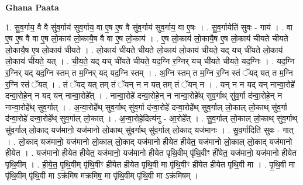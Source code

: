 \documentclass[17pt]{extarticle}
\begin{document}
\textbf{Ghana Paata } \newline

1. सु॒व॒र्गाय॒ वै वै सु॑व॒र्गाय॑ सुव॒र्गाय॒ वा ए॒ष ए॒ष वै सु॑व॒र्गाय॑ सुव॒र्गाय॒ वा ए॒षः । . सु॒व॒र्गायेति॑ सुवः - गाय॑ । . वा ए॒ष ए॒ष वै वा ए॒ष लो॒काय॑ लो॒कायै॒ष वै वा ए॒ष लो॒काय॑ । . ए॒ष लो॒काय॑ लो॒कायै॒ष ए॒ष लो॒काय॑ चीयते चीयते लो॒कायै॒ष ए॒ष लो॒काय॑ चीयते । . लो॒काय॑ चीयते चीयते लो॒काय॑ लो॒काय॑ चीयते॒ यद् यच् ची॑यते लो॒काय॑ लो॒काय॑ चीयते॒ यत् । . ची॒य॒ते॒ यद् यच् ची॑यते चीयते॒ यद॒ग्नि र॒ग्निर् यच् ची॑यते चीयते॒ यद॒ग्निः । . यद॒ग्नि र॒ग्निर् यद् यद॒ग्नि स्तम् त म॒ग्निर् यद् यद॒ग्नि स्तम् । . अ॒ग्नि स्तम् त म॒ग्नि र॒ग्नि स्तं ॅयद् यत् त म॒ग्नि र॒ग्नि स्तं ॅयत् । . तं ॅयद् यत् तम् तं ॅयन् न न यत् तम् तं ॅयन् न । . यन् न न यद् यन् नान्वा॒रोहे॑ दन्वा॒रोहे॒न् न यद् यन् नान्वा॒रोहे᳚त् । . नान्वा॒रोहे॑ दन्वा॒रोहे॒न् न नान्वा॒रोहे᳚थ् सुव॒र्गाथ् सु॑व॒र्गा द॑न्वा॒रोहे॒न् न नान्वा॒रोहे᳚थ् सुव॒र्गात् । . अ॒न्वा॒रोहे᳚थ् सुव॒र्गाथ् सु॑व॒र्गा द॑न्वा॒रोहे॑ दन्वा॒रोहे᳚थ् सुव॒र्गाल् लो॒काल् लो॒काथ् सु॑व॒र्गा द॑न्वा॒रोहे॑ दन्वा॒रोहे᳚थ् सुव॒र्गाल् लो॒कात् । . अ॒न्वा॒रोहे॒दित्य॑नु - आ॒रोहे᳚त् । . सु॒व॒र्गाल् लो॒काल् लो॒काथ् सु॑व॒र्गाथ् सु॑व॒र्गाल् लो॒काद् यज॑मानो॒ यज॑मानो लो॒काथ् सु॑व॒र्गाथ् सु॑व॒र्गाल् लो॒काद् यज॑मानः । . सु॒व॒र्गादिति॑ सुवः - गात् । . लो॒काद् यज॑मानो॒ यज॑मानो लो॒काल् लो॒काद् यज॑मानो हीयेत हीयेत॒ यज॑मानो लो॒काल् लो॒काद् यज॑मानो हीयेत । . यज॑मानो हीयेत हीयेत॒ यज॑मानो॒ यज॑मानो हीयेत पृथि॒वीम् पृ॑थि॒वीꣳ ही॑येत॒ यज॑मानो॒ यज॑मानो हीयेत पृथि॒वीम् । . ही॒ये॒त॒ पृ॒थि॒वीम् पृ॑थि॒वीꣳ ही॑येत हीयेत पृथि॒वी मा पृ॑थि॒वीꣳ ही॑येत हीयेत पृथि॒वी मा । . पृ॒थि॒वी मा पृ॑थि॒वीम् पृ॑थि॒वी मा ऽक्र॑मिष मक्रमिष॒ मा पृ॑थि॒वीम् पृ॑थि॒वी मा ऽक्र॑मिषम् । \newline
\end{document}
